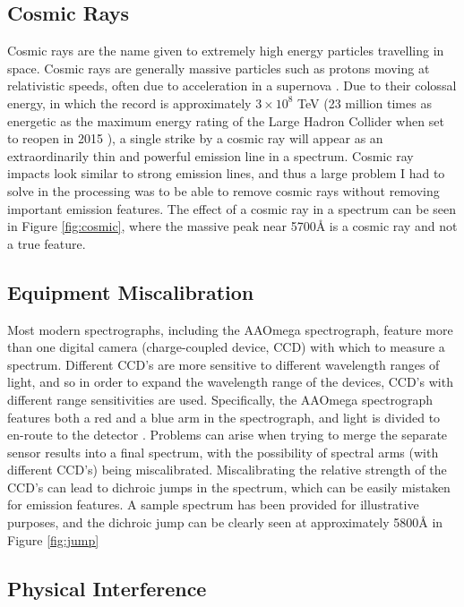 \documentclass[titlesmallcaps, examinerscopy, copyrightpage]{uqthesis}
\begin{document}
\subsection{Cosmic Rays}

Cosmic rays are the name given to extremely high energy particles travelling in space. Cosmic rays are generally massive particles such as protons moving at relativistic speeds, often due to acceleration in a supernova \cite{ackermann2013detection}. Due to their colossal energy, in which the record is approximately $3\times10^{8}$ TeV (23 million times as energetic as the maximum energy rating of the Large Hadron Collider when set to reopen in 2015 \cite{lhc}), a single strike by a cosmic ray will appear as an extraordinarily thin and powerful emission line in a spectrum. Cosmic ray impacts look similar to strong emission lines, and thus a large problem I had to solve in the processing was to be able to remove cosmic rays without removing important emission features. The effect of a cosmic ray in a spectrum can be seen in Figure \ref{fig:cosmic}, where the massive peak near 5700{\AA} is a cosmic ray and not a true feature.


\subsection{Equipment Miscalibration}

Most modern spectrographs, including the AAOmega spectrograph, feature more than one digital camera (charge-coupled device, CCD) with which to measure a spectrum. Different CCD's are more sensitive to different wavelength ranges of light, and so in order to expand the wavelength range of the devices, CCD's with different range sensitivities are used.  Specifically, the AAOmega spectrograph features both a red and a blue arm in the spectrograph, and light is divided to en-route to the detector \cite{aaomega}. Problems can arise when trying to merge the separate sensor results into a final spectrum, with the possibility of spectral arms (with different CCD's) being miscalibrated. Miscalibrating the relative strength of the CCD's can lead to dichroic jumps in the spectrum, which can be easily mistaken for emission features. A sample spectrum has been provided for illustrative purposes, and the dichroic jump can be clearly seen at approximately 5800{\AA} in Figure \ref{fig:jump}


\subsection{Physical Interference}
\end{document}
